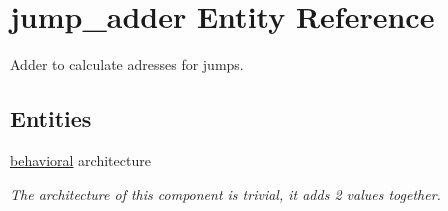 \hypertarget{classjump__adder}{\section{jump\-\_\-adder \-Entity \-Reference}
\label{classjump__adder}
}


\-Adder to calculate adresses for jumps.  


\subsection*{\-Entities}
\begin{DoxyCompactItemize}
\item 
\hyperlink{classjump__adder_1_1behavioral}{behavioral} architecture
\begin{DoxyCompactList}\small\item\em \-The architecture of this component is trivial, it adds 2 values together. \end{DoxyCompactList}\end{DoxyCompactItemize}
\*
\*
